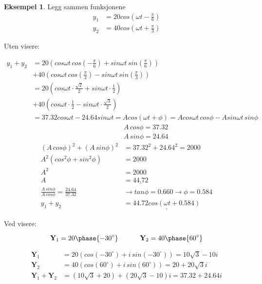 \documentclass[11pt]{article}
\theoremstyle{definition}
\theoremstyle{definition}
\newtheorem{mitteks}{Eksempel}[section]
\theoremstyle{definition}
\theoremstyle{definition}
\theoremstyle{definition}
\theoremstyle{definition}
\begin{document}
		\begin{mitteks}
			Legg sammen funksjonene
			\begin{align*}
			y_1&=20cos\left( \omega t - \frac{\pi}{6}\right) \\
			y_2&=40cos\left(\omega t + \frac{\pi}{3}\right)
			\end{align*}
			
			Uten visere:
			
			\begin{align*}
			y_1+y_2&=20\left( cos \omega t \, cos \left(- \frac{\pi}{6}\right)+sin\omega t \,sin\left( \frac{\pi}{6} \right) \right)\\
			&+40\left( cos \omega t \, cos \left( \frac{\pi}{3}\right)-sin\omega t \,sin\left( \frac{\pi}{3} \right) \right)\\
			&=20\left( cos \omega t\cdot\frac{\sqrt{2}}{2}+sin\omega t \cdot \frac{1}{2} \right)\\
			&+40\left( cos \omega t\cdot\frac{1}{2}-sin\omega t \cdot \frac{\sqrt{3}}{2} \right)\\
			&=37.32cos\omega t - 24.64 sin \omega t = Acos(\omega t+\phi) = Acos\omega t \, cos \phi - Asin\omega t \, sin\phi 
			\end{align*}
			\begin{align*}
			&A\,cos\phi=37.32\\
			&A\,sin\phi=24.64\\
			(A\,cos\phi)^2+(A\,sin\phi)^2&=37.32^2+24.64^2=2000\\
			A^2(cos^2\phi+sin^2\phi)&=2000\\
			A^2&=2000\\
			A&=\underline{44.72} \\
			\frac{A\,sin\phi}{A\,cos\phi}=\frac{24.64}{37.32}&\rightarrow tan\phi=0.660 \rightarrow \phi=0.584\\
			y_1+y_2&=\underline{\underline{44.72cos(\omega t+ 0.584)}}
			\end{align*}
		\end{mitteks}
		
		\newpage
		
		Ved visere:
		
		\[\textbf{Y}_1=20\phase{-30^{\circ}}\hspace{32pt}\textbf{Y}_2=40\phase{60^{\circ}} \]
		
		\begin{align*}
		\textbf{Y}_1&=20\left( cos(-30^{\circ})+i\,sin(-30^{\circ}) \right)=10\sqrt{3}-10i\\
		\textbf{Y}_2&=40\left( cos(60^{\circ})+i\,sin(60^{\circ}) \right)=20+20\sqrt{3}i\\
		\textbf{Y}_1+\textbf{Y}_2&=(10\sqrt{3}+20)+(20\sqrt{3}-10)i=37.32+24.64i
		\end{align*}
		
\end{document}
